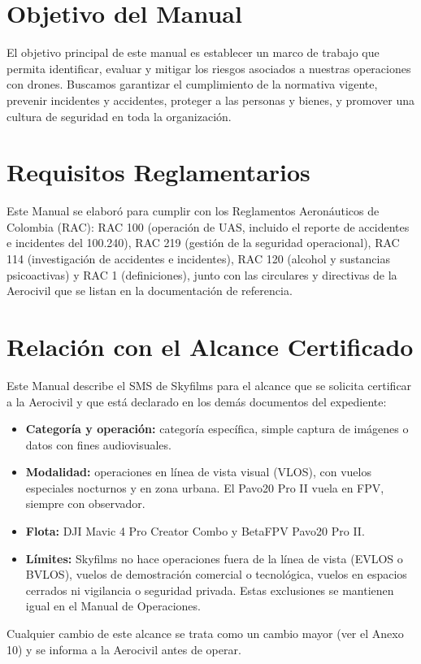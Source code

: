 \section{Objetivo del Manual}
El objetivo principal de este manual es establecer un marco de trabajo que permita identificar, evaluar y mitigar los riesgos asociados a nuestras operaciones con drones. Buscamos garantizar el cumplimiento de la normativa vigente, prevenir incidentes y accidentes, proteger a las personas y bienes, y promover una cultura de seguridad en toda la organización.



\section{Requisitos Reglamentarios}
Este Manual se elaboró para cumplir con los Reglamentos Aeronáuticos de Colombia (RAC): RAC 100 (operación de UAS, incluido el reporte de accidentes e incidentes del 100.240), RAC 219 (gestión de la seguridad operacional), RAC 114 (investigación de accidentes e incidentes), RAC 120 (alcohol y sustancias psicoactivas) y RAC 1 (definiciones), junto con las circulares y directivas de la Aerocivil que se listan en la documentación de referencia.

\section{Relación con el Alcance Certificado}
Este Manual describe el SMS de Skyfilms para el alcance que se solicita certificar a la Aerocivil y que está declarado en los demás documentos del expediente:
\begin{itemize}
    \item \textbf{Categoría y operación:} categoría específica, simple captura de imágenes o datos con fines audiovisuales.
    \item \textbf{Modalidad:} operaciones en línea de vista visual (VLOS), con vuelos especiales nocturnos y en zona urbana. El Pavo20 Pro II vuela en FPV, siempre con observador.
    \item \textbf{Flota:} DJI Mavic 4 Pro Creator Combo y BetaFPV Pavo20 Pro II.
    \item \textbf{Límites:} Skyfilms no hace operaciones fuera de la línea de vista (EVLOS o BVLOS), vuelos de demostración comercial o tecnológica, vuelos en espacios cerrados ni vigilancia o seguridad privada. Estas exclusiones se mantienen igual en el Manual de Operaciones.
\end{itemize}
Cualquier cambio de este alcance se trata como un cambio mayor (ver el Anexo 10) y se informa a la Aerocivil antes de operar.

